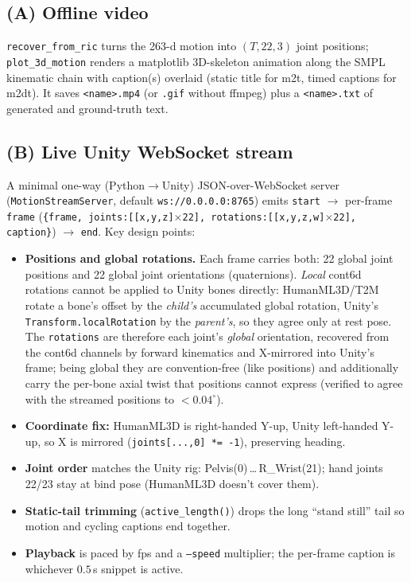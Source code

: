 \documentclass[10pt,twocolumn]{article}
\newcommand{\code}[1]{\texttt{\small #1}}
\begin{document}
\subsection{(A) Offline video}
\code{recover\_from\_ric} turns the 263-d motion into $(T,22,3)$ joint positions;
\code{plot\_3d\_motion} renders a matplotlib 3D-skeleton animation along the SMPL kinematic chain
with caption(s) overlaid (static title for m2t, timed captions for m2dt). It saves
\code{<name>.mp4} (or \code{.gif} without ffmpeg) plus a \code{<name>.txt} of generated and
ground-truth text.

\subsection{(B) Live Unity WebSocket stream}
\label{sec:stream}
A minimal one-way (Python$\rightarrow$Unity) JSON-over-WebSocket server (\code{MotionStreamServer},
default \code{ws://0.0.0.0:8765}) emits \code{start} $\rightarrow$ per-frame \code{frame}
(\code{\{frame, joints:[[x,y,z]$\times$22], rotations:[[x,y,z,w]$\times$22], caption\}}) $\rightarrow$
\code{end}. Key design points:
\begin{itemize}
  \item \textbf{Positions and global rotations.} Each frame carries both: 22 global joint
        positions and 22 global joint orientations (quaternions). \emph{Local} cont6d rotations
        cannot be applied to Unity bones directly: HumanML3D/T2M rotate a bone's offset by the
        \emph{child's} accumulated global rotation, Unity's \code{Transform.localRotation} by the
        \emph{parent's}, so they agree only at rest pose. The \code{rotations} are therefore each
        joint's \emph{global} orientation, recovered from the cont6d channels by forward kinematics
        and X-mirrored into Unity's frame; being global they are convention-free (like positions)
        and additionally carry the per-bone axial twist that positions cannot express (verified to
        agree with the streamed positions to ${<}0.04^\circ$).
  \item \textbf{Coordinate fix:} HumanML3D is right-handed Y-up, Unity left-handed Y-up, so X is
        mirrored (\code{joints[...,0]\,*=\,-1}), preserving heading.
  \item \textbf{Joint order} matches the Unity rig: Pelvis(0)\,\ldots\,R\_Wrist(21); hand joints
        22/23 stay at bind pose (HumanML3D doesn't cover them).
  \item \textbf{Static-tail trimming} (\code{active\_length()}) drops the long ``stand still'' tail
        so motion and cycling captions end together.
  \item \textbf{Playback} is paced by fps and a \code{--speed} multiplier; the per-frame caption is
        whichever $0.5$\,s snippet is active.
\end{itemize}
\end{document}
